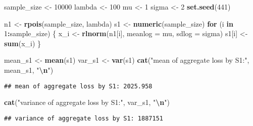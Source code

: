 \documentclass[
]{article}
\newenvironment{Shaded}{\begin{snugshade}}{\end{snugshade}}
\newcommand{\AttributeTok}[1]{\textcolor[rgb]{0.13,0.29,0.53}{#1}}
\newcommand{\ControlFlowTok}[1]{\textcolor[rgb]{0.13,0.29,0.53}{\textbf{#1}}}
\newcommand{\DecValTok}[1]{\textcolor[rgb]{0.00,0.00,0.81}{#1}}
\newcommand{\FunctionTok}[1]{\textcolor[rgb]{0.13,0.29,0.53}{\textbf{#1}}}
\newcommand{\NormalTok}[1]{#1}
\newcommand{\OtherTok}[1]{\textcolor[rgb]{0.56,0.35,0.01}{#1}}
\newcommand{\SpecialCharTok}[1]{\textcolor[rgb]{0.81,0.36,0.00}{\textbf{#1}}}
\newcommand{\StringTok}[1]{\textcolor[rgb]{0.31,0.60,0.02}{#1}}
\begin{document}
\begin{Shaded}
\begin{Highlighting}[]
\NormalTok{sample\_size }\OtherTok{\textless{}{-}} \DecValTok{10000}
\NormalTok{lambda }\OtherTok{\textless{}{-}} \DecValTok{100}
\NormalTok{mu }\OtherTok{\textless{}{-}} \DecValTok{1}
\NormalTok{sigma }\OtherTok{\textless{}{-}} \DecValTok{2}
\FunctionTok{set.seed}\NormalTok{(}\DecValTok{441}\NormalTok{)}

\NormalTok{n1 }\OtherTok{\textless{}{-}} \FunctionTok{rpois}\NormalTok{(sample\_size, lambda)}
\NormalTok{s1 }\OtherTok{\textless{}{-}} \FunctionTok{numeric}\NormalTok{(sample\_size)}
\ControlFlowTok{for}\NormalTok{ (i }\ControlFlowTok{in} \DecValTok{1}\SpecialCharTok{:}\NormalTok{sample\_size) \{}
\NormalTok{  x\_i }\OtherTok{\textless{}{-}} \FunctionTok{rlnorm}\NormalTok{(n1[i], }\AttributeTok{meanlog =}\NormalTok{ mu, }\AttributeTok{sdlog =}\NormalTok{ sigma) }
\NormalTok{  s1[i] }\OtherTok{\textless{}{-}} \FunctionTok{sum}\NormalTok{(x\_i)}
\NormalTok{\}}


\NormalTok{mean\_s1 }\OtherTok{\textless{}{-}} \FunctionTok{mean}\NormalTok{(s1)}
\NormalTok{var\_s1 }\OtherTok{\textless{}{-}} \FunctionTok{var}\NormalTok{(s1)}
\FunctionTok{cat}\NormalTok{(}\StringTok{"mean of aggregate loss by S1:"}\NormalTok{, mean\_s1, }\StringTok{"}\SpecialCharTok{\textbackslash{}n}\StringTok{"}\NormalTok{)}
\end{Highlighting}
\end{Shaded}

\begin{verbatim}
## mean of aggregate loss by S1: 2025.958
\end{verbatim}

\begin{Shaded}
\begin{Highlighting}[]
\FunctionTok{cat}\NormalTok{(}\StringTok{"variance of aggregate loss by S1:"}\NormalTok{, var\_s1, }\StringTok{"}\SpecialCharTok{\textbackslash{}n}\StringTok{"}\NormalTok{)}
\end{Highlighting}
\end{Shaded}

\begin{verbatim}
## variance of aggregate loss by S1: 1887151
\end{verbatim}
\end{document}
